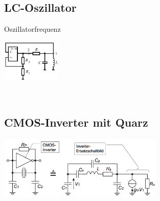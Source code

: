         \subsection{LC-Oszillator}
        \begin{minipage}[T]{15cm}
            Oszillatorfrequenz
            \hspace{14mm}\\
        \end{minipage}
        \begin{minipage}{4cm}
            \includegraphics[height=2cm]{./bilder/LC_Oszillator.png}
        \end{minipage}\\

        \subsection{CMOS-Inverter mit Quarz}
        \includegraphics[height=3cm]{./bilder/QuarzOszillator.png}
        


